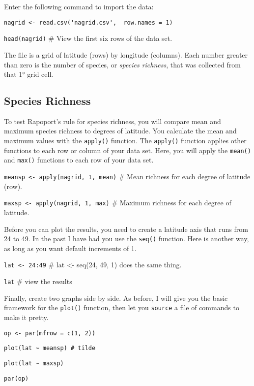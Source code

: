 \documentclass[11pt]{article}
\begin{document}
Enter the following command to import the data:

\begin{verbatim}
nagrid <- read.csv('nagrid.csv',  row.names = 1)
\end{verbatim}

\texttt{head(nagrid)} \qquad \# View the first six rows of the data set.

The file is a grid of latitude (rows) by longitude (columns). Each
number greater than zero is the number of species, or \emph{species
richness}, that was collected from that 1° grid cell.

\subsection*{Species Richness}

To test Rapoport's rule for species richness, you will compare mean and
maximum species richness to degrees of latitude. You calculate the
mean and maximum values with the \texttt{apply()} function. The \texttt{apply()}
function applies other functions to each row or column 
of your data set. Here, you will apply the \texttt{mean()} and
\texttt{max()} functions to each row of your data set.

\texttt{meansp \textless{}- apply(nagrid, 1, mean)} \quad \# Mean 
richness for each degree of latitude (row).

\texttt{maxsp \textless{}- apply(nagrid, 1, max)} \qquad \# Maximum 
richness for each degree of latitude.

Before you can plot the results, you need to create a latitude axis 
that runs from 24 to 49. In the past I have had you use the 
\texttt{seq()} function. Here is another way, as long as you want 
default increments of 1.

\texttt{lat \textless{}- 24:49}  \qquad \# lat \textless{}- 
seq(24, 49, 1) does the same thing.

\texttt{lat} \qquad \# view the results

Finally, create two graphs side by side.
As before, I will give you the basic framework for the \texttt{plot()} 
function, then let you \texttt{source} a file of commands to make it 
pretty.

\texttt{op \textless{}- par(mfrow = c(1, 2))} 

\texttt{plot(lat~\textasciitilde{}~meansp) \quad \# tilde}  

\texttt{plot(lat~\textasciitilde{}~maxsp)}

\texttt{par(op)}
\end{document}
